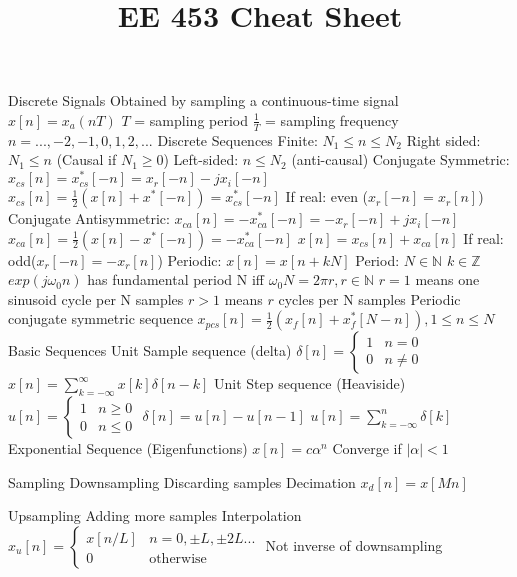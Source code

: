 \documentclass[14pt]{extarticle}
\title{EE 453 Cheat Sheet}
\begin{document}
	\maketitle
	
	\begin{outline}		
		\1	Discrete Signals
			\2	Obtained by sampling a continuous-time signal
			\2	$x[n] = x_a(nT)$
				\3	$T$ = sampling period
				\3	$\frac{1}{T}$ = sampling frequency
				\3	$n = ...,-2,-1,0,1,2,...$
			\2	Discrete Sequences
				\3	Finite: $N_1 \le n \le N_2$
				\3	Right sided: $N_1 \le n$ (Causal if $N_1 \ge 0$)
				\3	Left-sided:	$n \le N_2$ (anti-causal)
				\3	Conjugate Symmetric: $x_{cs}[n] = x^*_{cs}[-n] = x_r[-n] - jx_i[-n]$
					\4	$x_{cs}[n] = \frac{1}{2}(x[n] + x^*[-n]) = x_{cs}^*[-n]$
					\4	If real:	even ($x_r[-n] = x_r[n]$)
				\3	Conjugate Antisymmetric:	$x_{ca}[n] = -x^*_{ca}[-n] = -x_r[-n] + jx_i[-n]$
					\4	$x_{ca}[n] = \frac{1}{2}(x[n] - x^*[-n]) = -x_{ca}^*[-n]$
					\4	$x[n] = x_{cs}[n] + x_{ca}[n]$
					\4	If real:	odd($x_r[-n] = -x_r[n]$)	
				\3	Periodic:	$x[n] = x[n + kN]$
					\4	Period: $N \in \mathbb{N}$
					\4	$k \in \mathbb{Z}$
					\4	$exp(j\omega_0 n)$ has fundamental period N iff $\omega_0N = 2\pi r, r \in \mathbb{N}$
					\4	$r = 1$ means one sinusoid cycle per N samples
					\4	$r > 1$ means $r$ cycles per N samples
					\4	Periodic conjugate symmetric sequence
					\4	$x_{pcs}[n] = \frac{1}{2}(x_f[n] + x_f^*[N-n]), 1 \le n \le N$
			\2	Basic Sequences
				\3	Unit Sample sequence (delta)
					\4	$\delta[n] = \begin{cases}  1 & n = 0 \\ 0 & n \ne 0 \end{cases}$
					\4	$x[n] = \sum_{k = -\infty}^{\infty} x[k]\delta[n - k]$
				\3	Unit Step sequence (Heaviside)
					\4	$u[n] = \begin{cases} 1 & n \ge 0 \\ 0 & n \le 0 \end{cases}$
					\4	$\delta[n] = u[n] - u[n-1]$
					\4	$u[n] = \sum_{k = -\infty}^n \delta[k]$
				\3	Exponential Sequence (Eigenfunctions)
					\4	$x[n] = c\alpha^n$
					\4	Converge if $|\alpha| < 1$

			\2	Sampling
				\3	Downsampling
					\4	Discarding samples
					\4	Decimation
					\4	$x_d[n] = x[Mn]$

				\3	Upsampling
					\4	Adding more samples
					\4	Interpolation
					\4	$x_u[n] = \begin{cases}	x[n/L] & n = 0, \pm L, \pm 2L...\\
																				0 & \text{otherwise} \end{cases}$
					\4	Not inverse of downsampling
		

\end{outline}
\end{document}

